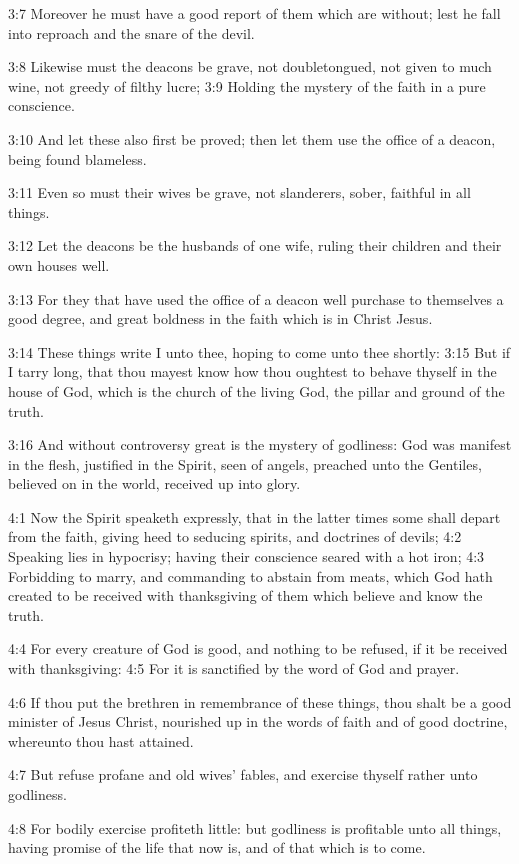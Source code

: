 3:7 Moreover he must have a good report of them which are without; lest he fall into reproach and the snare of the devil.

3:8 Likewise must the deacons be grave, not doubletongued, not given to much wine, not greedy of filthy lucre; 3:9 Holding the mystery of the faith in a pure conscience.

3:10 And let these also first be proved; then let them use the office of a deacon, being found blameless.

3:11 Even so must their wives be grave, not slanderers, sober, faithful in all things.

3:12 Let the deacons be the husbands of one wife, ruling their children and their own houses well.

3:13 For they that have used the office of a deacon well purchase to themselves a good degree, and great boldness in the faith which is in Christ Jesus.

3:14 These things write I unto thee, hoping to come unto thee shortly: 3:15 But if I tarry long, that thou mayest know how thou oughtest to behave thyself in the house of God, which is the church of the living God, the pillar and ground of the truth.

3:16 And without controversy great is the mystery of godliness: God was manifest in the flesh, justified in the Spirit, seen of angels, preached unto the Gentiles, believed on in the world, received up into glory.

4:1 Now the Spirit speaketh expressly, that in the latter times some shall depart from the faith, giving heed to seducing spirits, and doctrines of devils; 4:2 Speaking lies in hypocrisy; having their conscience seared with a hot iron; 4:3 Forbidding to marry, and commanding to abstain from meats, which God hath created to be received with thanksgiving of them which believe and know the truth.

4:4 For every creature of God is good, and nothing to be refused, if it be received with thanksgiving: 4:5 For it is sanctified by the word of God and prayer.

4:6 If thou put the brethren in remembrance of these things, thou shalt be a good minister of Jesus Christ, nourished up in the words of faith and of good doctrine, whereunto thou hast attained.

4:7 But refuse profane and old wives' fables, and exercise thyself rather unto godliness.

4:8 For bodily exercise profiteth little: but godliness is profitable unto all things, having promise of the life that now is, and of that which is to come.

